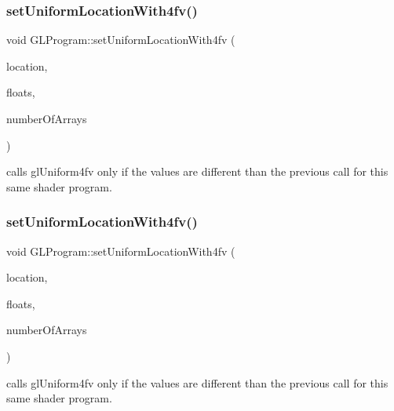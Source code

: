 \subsubsection{\texorpdfstring{set\+Uniform\+Location\+With4fv()}{setUniformLocationWith4fv()}\hspace{0.1cm}{\footnotesize\ttfamily [1/2]}}
{\footnotesize\ttfamily void G\+L\+Program\+::set\+Uniform\+Location\+With4fv (\begin{DoxyParamCaption}\item[{G\+Lint}]{location,  }\item[{const G\+Lfloat $\ast$}]{floats,  }\item[{unsigned int}]{number\+Of\+Arrays }\end{DoxyParamCaption})}

calls gl\+Uniform4fv only if the values are different than the previous call for this same shader program. \mbox{\label{classGLProgram_a1ec5c5f3d024757f9c35e4bff362a3ee}} 
\subsubsection{\texorpdfstring{set\+Uniform\+Location\+With4fv()}{setUniformLocationWith4fv()}\hspace{0.1cm}{\footnotesize\ttfamily [2/2]}}
{\footnotesize\ttfamily void G\+L\+Program\+::set\+Uniform\+Location\+With4fv (\begin{DoxyParamCaption}\item[{G\+Lint}]{location,  }\item[{const G\+Lfloat $\ast$}]{floats,  }\item[{unsigned int}]{number\+Of\+Arrays }\end{DoxyParamCaption})}

calls gl\+Uniform4fv only if the values are different than the previous call for this same shader program. \mbox{\label{classGLProgram_ab0763aef27f2734758ea139dbfe9e139}} 
